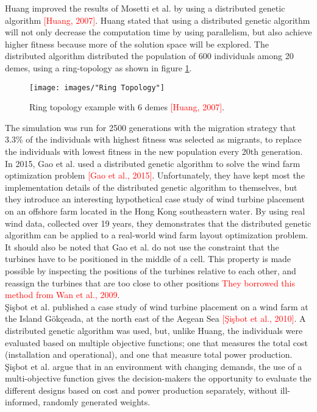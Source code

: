 \noindent Huang improved the results of Mosetti et al. by using a distributed genetic algorithm \textcolor{red}{[Huang, 2007]}. Huang stated that using a distributed genetic algorithm will not only decrease the computation time by using parallelism, but also achieve higher fitness because more of the solution space will be explored. The distributed algorithm distributed the population of 600 individuals among 20 demes, using a ring-topology as shown in figure \ref{Ring Topology}.

\begin{figure}[h!]
\begin{center}
\texttt{[image: images/"Ring Topology"]}
\caption{Ring topology example with 6 demes \textcolor{red}{[Huang, 2007]}.}
\label{Ring Topology}
\end{center}
\end{figure}


The simulation was run for 2500 generations with the migration strategy that 3.3\% of the individuals with highest fitness was selected as migrants, to replace the individuals with lowest fitness in the new population every 20th generation. \\

\noindent In 2015, Gao et al. used a distributed genetic algorithm to solve the wind farm optimization problem \textcolor{red}{[Gao et al., 2015]}. Unfortunately, they have kept most the implementation details of the distributed genetic algorithm to themselves, but they introduce an interesting hypothetical case study of wind turbine placement on an offshore farm located in the Hong Kong southeastern water. By using real wind data, collected over 19 years, they demonstrates that the distributed genetic algorithm can be applied to a real-world wind farm layout optimization problem. It should also be noted that Gao et al. do not use the constraint that the turbines have to be positioned in the middle of a cell. This property is made possible by inspecting the positions of the turbines relative to each other, and reassign the turbines that are too close to other positions \textcolor{red}{They borrowed this method from Wan et al., 2009}.\\

\noindent \c{S}i\c{s}bot et al. published a case study of wind turbine placement on a wind farm at the Island G{\"o}k\c{c}eada, at the north east of the Aegean Sea \textcolor{red}{[\c{S}i\c{s}bot et al., 2010]}. A distributed genetic algorithm was used, but, unlike Huang, the individuals were evaluated based on multiple objective functions; one that measures the total cost (installation and operational), and one that measure total power production. \c{S}i\c{s}bot et al. argue that in an environment with changing demands, the use of a multi-objective function gives the decision-makers the opportunity to evaluate the different designs based on cost and power production separately, without ill-informed, randomly generated weights.


